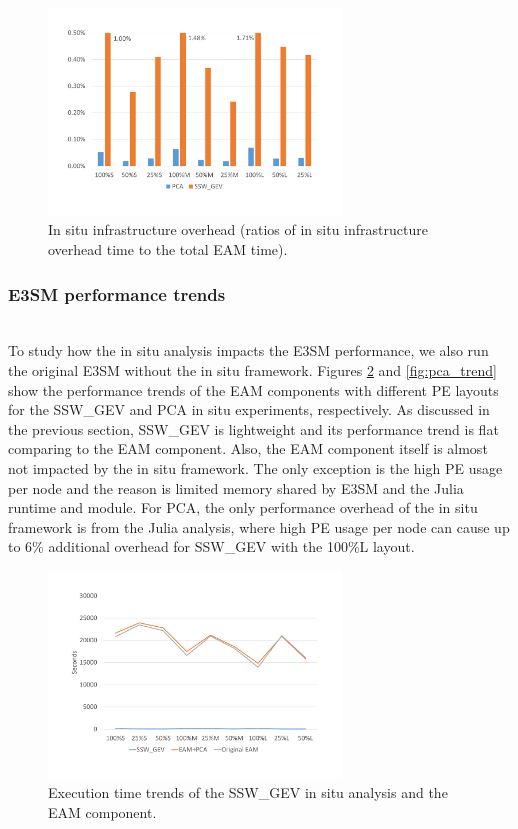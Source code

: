 \documentclass{juliacon}
\begin{document}
\begin{figure}
    \centering
    \includegraphics[width=\linewidth, height=5.5cm]{paper/figures/infrastructureoverhead.pdf}
    \caption{In situ infrastructure overhead (ratios of in situ infrastructure overhead time to the total EAM time).}
    \label{fig:pca_break}
\end{figure}



\subsubsection{E3SM performance trends}\hspace*{\fill} \\

To study how the in situ analysis impacts the E3SM performance, we also run the original E3SM without the in situ framework. Figures \ref{fig:ssw_trend} and \ref{fig:pca_trend} show the performance trends of the EAM components with different PE layouts for the SSW\_GEV and PCA in situ experiments, respectively. As discussed in the previous section, SSW\_GEV is lightweight and its performance trend is flat comparing to the EAM component. Also, the EAM component itself is almost not impacted by the in situ framework. The only exception is the high PE usage per node and the reason is limited memory shared by E3SM and the Julia runtime and module. For PCA, the only performance overhead of the in situ framework is from the Julia analysis, where high PE usage per node can cause up to 6\% additional overhead for SSW\_GEV with the 100\%L layout. 


\begin{figure}
    \centering
    \includegraphics[width=\linewidth, height=5.5cm]{figures/ssw_trend.pdf}
    \caption{Execution time trends of the SSW\_GEV in situ analysis and the EAM component.}
    \label{fig:ssw_trend}
\end{figure}
\end{document}
